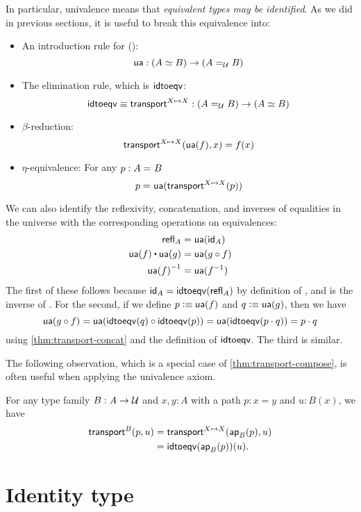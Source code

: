 In particular, univalence means that \emph{equivalent types may be identified}.
As we did in previous sections, it is useful to break this equivalence into:
%
\begin{itemize}
\item An introduction rule for {()}:
  \[
  \ua : ({\eqv A B}) \to (\id[\type]{A}{B})
  \]
\item The elimination rule, which is $\idtoeqv$:
  \[
  \idtoeqv \jdeq \transfibf{X \mapsto X} : (\id[\type]{A}{B}) \to (\eqv A B)
  \]
\item $\beta$-reduction: 
  \[
  \transfib{X \mapsto X}{\ua(f)}{x} = f(x)
  \]
\item $\eta$-equivalence: For any $p : \id A B$
  \[
  \id{p}{\ua(\transfibf{X \mapsto X}(p))}
  \]
\end{itemize}
%
We can also identify the reflexivity, concatenation, and inverses of equalities in the universe with the corresponding operations on equivalences:
\begin{align*}
  \refl{A} &= \ua(\idfunc[A]) \\
  \ua(f) \ct \ua(g) &= \ua(g\circ f) \\
  \opp{\ua(f)} &= \ua(f^{-1})
\end{align*}
The first of these follows because $\idfunc[A] = \idtoeqv(\refl{A})$ by definition of \idtoeqv, and \ua is the inverse of \idtoeqv.
For the second, if we define $p \defeq \ua(f)$ and $q\defeq \ua(g)$, then we have
\[ \ua(g\circ f) = \ua(\idtoeqv(q) \circ \idtoeqv(p)) = \ua(\idtoeqv(p\cdot q)) = p\cdot q\]
using \autoref{thm:transport-concat} and the definition of $\idtoeqv$.
The third is similar.

The following observation, which is a special case of \autoref{thm:transport-compose}, is often useful when applying the univalence axiom.

\begin{lem}\label{thm:transport-is-ap}
  For any type family $B:A\to\type$ and $x,y:A$ with a path $p:x=y$ and $u:B(x)$, we have
  \begin{align*}
    \transfib{B}{p}{u} &= \transfib{X\mapsto X}{\apfunc{B}(p)}{u}\\
    &= \idtoeqv(\apfunc{B}(p))(u).
  \end{align*}
\end{lem}

%

\section{Identity type}
\label{sec:compute-paths}

